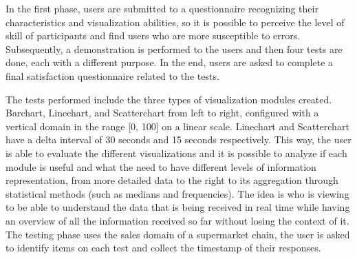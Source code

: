 \documentclass[letterpaper, 10 pt, conference]{ieeeconf}  %
\begin{document}
In the first phase, users are submitted to a questionnaire recognizing their characteristics and visualization abilities, so it is possible to perceive the level of skill of participants and find users who are more susceptible to errors. Subsequently, a demonstration is performed to the users and then four tests are done, each with a different purpose. In the end, users are asked to complete a final satisfaction questionnaire related to the tests.

The tests performed include the three types of visualization modules created. Barchart, Linechart, and Scatterchart from left to right, configured with a vertical domain in the range [0, 100] on a linear scale. Linechart and Scatterchart have a delta interval of 30 seconds and 15 seconds respectively. This way, the user is able to evaluate the different visualizations and it is possible to analyze if each module is useful and what the need to have different levels of information representation, from more detailed data to the right to its aggregation through statistical methods (such as medians and frequencies). The idea is who is viewing to be able to understand the data that is being received in real time while having an overview of all the information received so far without losing the context of it. \newline 
The testing phase uses the sales domain of a supermarket chain, the user is asked to identify items on each test and collect the timestamp of their responses.
\end{document}

